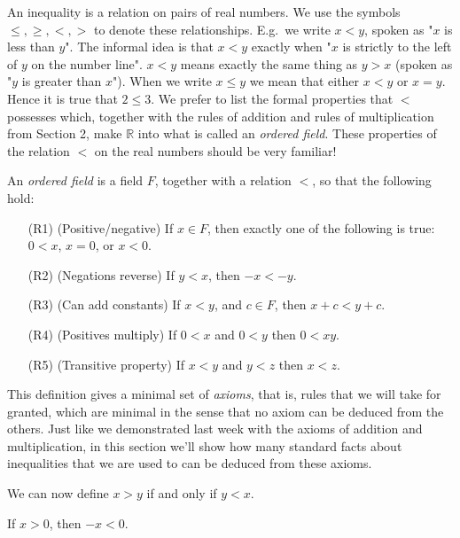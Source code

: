 \documentclass[11pt,dvipsnames]{book}
\numberwithin{figure}{section} %
\numberwithin{table}{section} %
\begin{document}
An inequality is a relation on pairs of real numbers.
We use the symbols $\leq,\geq,<,>$ to denote these relationships.
E.g.~we write $x < y$, spoken as "$x$ is less than $y$".
The informal idea is that $x<y$ exactly when "$x$ is strictly to the left of $y$ on the number line".
$x < y$ means exactly the same thing as $y > x$ (spoken as "$y$ is greater than $x$").
When we write $x \leq y$ we mean that either $x < y$ or $x=y$.
Hence it is true that $2 \leq 3$.
We prefer to list the formal properties that $<$ possesses which, together with the rules of addition and rules of multiplication from Section 2, make $\mathbb{R}$ into what is called an {\em ordered field}.
These properties of the relation $<$ on the real numbers should be very familiar!

\medskip
\begin{definition} An {\em ordered field} is a field $F$, together with a relation $<$, so that the following hold: %
\begin{enumerate}
\item[(R1)] (Positive/negative) If $x\in F$, then exactly one of the following is true: $0<x$, $x=0$, or $x<0$.
\item[(R2)] (Negations reverse) If $y<x$, then $-x<-y$.
\item[(R3)] (Can add constants) If $x<y$, and $c\in F$, then $x+c<y+c$.
\item[(R4)] (Positives multiply) If $0<x$ and $0<y$ then $0<xy$.
\item[(R5)] (Transitive property) If $x<y$ and $y<z$ then $x<z$.
\end{enumerate}
\end{definition}

This definition gives a minimal set of {\it axioms}, that is, rules that we will take for granted, which are minimal in the sense that no axiom can be deduced from the others. Just like we demonstrated last week with the axioms of addition and multiplication, in this section we'll show how many standard facts about inequalities that we are used to can be deduced from these axioms. %

We can now define \(x>y\) if and only if \(y<x\).

\begin{proposition}
If $x>0$, then $-x<0$.
\end{proposition}
\end{document}
